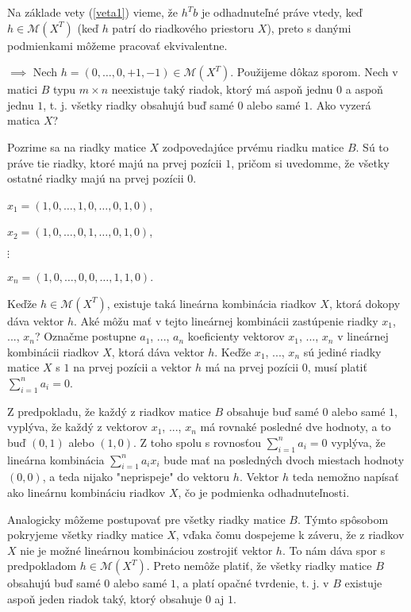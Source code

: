 \begin{dokaz}
Na základe vety (\ref{veta1}) vieme, že $h^T b$ je odhadnuteľné práve vtedy, keď $h \in \mathcal{M}(X^T)$
(keď $h$ patrí do riadkového priestoru $X$),
preto s danými podmienkami môžeme pracovať ekvivalentne.

$\boxed{\implies}$ Nech $h = (0, \ldots, 0, +1, -1) \in \mathcal{M}(X^T)$. Použijeme dôkaz sporom. 
Nech v matici $B$ typu $m \times n$ neexistuje taký riadok, ktorý má aspoň jednu $0$ a aspoň jednu $1$,
t. j. všetky riadky obsahujú buď samé $0$ alebo samé $1$.
Ako vyzerá matica $X$?

Pozrime sa na riadky matice $X$ zodpovedajúce prvému riadku matice $B$.
Sú to práve tie riadky, ktoré majú na prvej pozícii $1$, pričom si uvedomme, že všetky ostatné riadky majú na prvej pozícii $0$.

\begin{center}
$
x_1 = (1, 0, \ldots, 1, 0, \ldots, 0, 1, 0)
$,
\end{center}
\begin{center}
$
x_2 = (1, 0, \ldots, 0, 1, \ldots, 0, 1, 0)
$,
\end{center}
\begin{center}
$\vdots$
\end{center}
\begin{center}
$
x_n = (1, 0, \ldots, 0, 0, \ldots, 1, 1, 0)
$.
\end{center}

Keďže $h \in \mathcal{M}(X^T)$, existuje taká lineárna kombinácia riadkov $X$, ktorá dokopy dáva vektor $h$.
Aké môžu mať v tejto lineárnej kombinácii zastúpenie riadky $x_1$, ..., $x_n$?
Označme postupne $a_1$, ..., $a_n$ koeficienty vektorov $x_1$, ..., $x_n$ v lineárnej kombinácii riadkov $X$, ktorá dáva vektor $h$.
Keďže $x_1$, ..., $x_n$ sú jediné riadky matice $X$ s $1$ na prvej pozícii a vektor $h$ má na prvej pozícii $0$,
musí platiť $\sum_{i = 1}^n a_i = 0$.

Z predpokladu, že každý z riadkov matice $B$ obsahuje buď samé $0$ alebo samé $1$, vyplýva,
že každý z vektorov $x_1$, ..., $x_n$ má rovnaké posledné dve hodnoty, a to buď $(0, 1)$ alebo $(1, 0)$.
Z toho spolu s rovnosťou $\sum_{i = 1}^n a_i = 0$ vyplýva, že lineárna kombinácia $\sum_{i = 1}^n a_i x_i$
bude mať na posledných dvoch miestach hodnoty $(0, 0)$, a teda nijako "neprispeje" do vektoru $h$.
Vektor $h$ teda nemožno napísať ako lineárnu kombináciu riadkov $X$, čo je podmienka odhadnuteľnosti.

Analogicky môžeme postupovať pre všetky riadky matice $B$.
Týmto spôsobom pokryjeme všetky riadky matice $X$, vďaka čomu dospejeme k záveru,
že z riadkov $X$ nie je možné lineárnou kombináciou zostrojiť vektor $h$.
To nám dáva spor s predpokladom $h \in \mathcal{M}(X^T)$.
Preto nemôže platiť, že všetky riadky matice $B$ obsahujú buď samé $0$ alebo samé $1$,
a platí opačné tvrdenie, t. j. v $B$ existuje aspoň jeden riadok taký, ktorý obsahuje $0$ aj $1$.


\end{dokaz}
